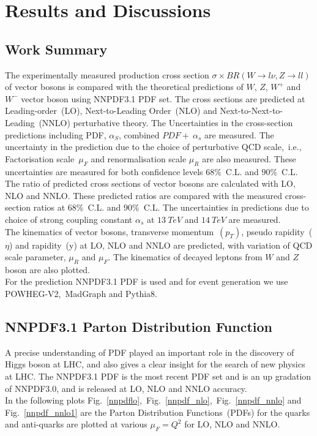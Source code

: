 
\chapter{Results and Discussions}
\section{Work Summary}
The experimentally measured production cross section $ \sigma \times BR(W \rightarrow l \nu,Z \rightarrow ll)$ of vector bosons is compared with the theoretical predictions of $W$, $Z$, $W^{+}$ and $W^{-}$ vector boson using NNPDF3.1 PDF set. The cross sections are predicted at Leading-order~(LO), Next-to-Leading Order~(NLO) and Next-to-Next-to-Leading~(NNLO) perturbative theory. The Uncertainties in the cross-section predictions including PDF, $\alpha_{S}$, combined $PDF+~\alpha_{s}$ are measured. The uncertainty in the prediction due to the choice of perturbative QCD scale,~i.e., Factorisation scale~$\mu_{F}$ and renormalisation scale $\mu_{R}$ are also measured. These  uncertainties are measured for both confidence levels $68\%$~C.L. and $90\%$~C.L. The ratio of predicted cross sections of vector bosons are calculated with LO, NLO and NNLO. These predicted ratios are compared with the measured cross-section ratios at $68\%$~C.L. and $90\%$~C.L.
The uncertainties in predictions due to choice of strong coupling constant $\alpha_{s}$ at $13~TeV$ and $14~TeV$ are measured.\\
The kinematics of vector bosons, transverse momentum~$(p_{T})$, pseudo rapidity~($\eta$) and rapidity~(y) at LO, NLO and NNLO are predicted, with variation of QCD scale parameter, $\mu_{R}$ and $\mu_{F}$. The kinematics of decayed leptons from $W$ and $Z$ boson are also plotted.\\
For the prediction NNPDF3.1 PDF is used and for event generation we use POWHEG-V2,~MadGraph and Pythia8.
\section{NNPDF3.1 Parton Distribution Function}
A precise understanding of PDF played an important role in the discovery of Higgs boson at LHC, and also gives a clear insight for the search of new physics at LHC. The NNPDF3.1 PDF is the most recent PDF set and is an up gradation of NNPDF3.0, and is released at LO, NLO and NNLO accuracy.\\
In the following plots Fig.~\ref{nnpdflo},~Fig.~\ref{nnpdf_nlo},~Fig.~\ref{nnpdf_nnlo} and Fig.~\ref{nnpdf_nnlo1} are the Parton Distribution Functions~(PDFs) for the quarks and anti-quarks are plotted at various $\mu_{F}=Q^{2}$ for LO, NLO and NNLO.

